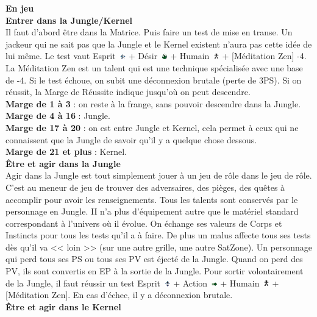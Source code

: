\documentclass[11pt,twoside,a4paper]{article}
\def\imgESPRI{\includegraphics[width=0.25cm]{../../../../../imgGraphics/rolePlayingGame/SimulacreS/mini12x12/esprit.png} }
\def\imgACTIO{\includegraphics[width=0.25cm]{../../../../../imgGraphics/rolePlayingGame/SimulacreS/mini12x12/action.png} }
\def\imgDESIR{\includegraphics[width=0.25cm]{../../../../../imgGraphics/rolePlayingGame/SimulacreS/mini12x12/desir.png} }
\def\imgHUMAI{\includegraphics[width=0.25cm]{../../../../../imgGraphics/rolePlayingGame/SimulacreS/mini12x12/humain.png} }
\begin{document}
\begin{multicols}{3}
{\textbf{\Large En jeu}~\\

\textbf{\large Entrer dans la Jungle/Kernel}~\\

Il faut d'abord {\^e}tre dans la Matrice. Puis faire un test de mise en transe. Un jackeur qui ne sait pas que la Jungle et le Kernel existent n'aura pas cette id{\'e}e de lui m{\^e}me. Le test vaut Esprit~\imgESPRI + D{\'e}sir~\imgDESIR + Humain~\imgHUMAI + [M{\'e}ditation Zen] -4. La M{\'e}ditation Zen est un talent qui est une technique sp{\'e}cialis{\'e}e avec une base de -4. Si le test {\'e}choue, on subit une d{\'e}connexion brutale (perte de 3PS). Si on r{\'e}ussit, la Marge de R{\'e}ussite indique jusqu'o{\`u} on peut descendre.~\\
\textbf{Marge de 1 {\`a} 3} : on reste {\`a} la frange, sans pouvoir descendre dans la Jungle.~\\
\textbf{Marge de 4 {\`a} 16} : Jungle. ~\\
\textbf{Marge de 17 {\`a} 20} : on est entre Jungle et Kernel, cela permet {\`a} ceux qui ne connaissent que la Jungle de savoir qu'il y a quelque chose dessous.~\\
\textbf{Marge de 21 et plus} : Kernel.~\\

\textbf{\large {\^E}tre et agir dans la Jungle}~\\

Agir dans la Jungle est tout simplement jouer {\`a} un jeu de r{\^o}le dans le jeu de r{\^o}le. C'est au meneur de jeu de trouver des adversaires, des pi{\`e}ges, des qu{\^e}tes {\`a} accomplir pour avoir les renseignements. Tous les talents sont conserv{\'e}s par le personnage en Jungle. II n'a plus d'{\'e}quipement autre que le mat{\'e}riel standard correspondant {\`a} l'univers o{\`u} il {\'e}volue. On {\'e}change ses valeurs de Corps et Instincts pour tous les tests qu'il a {\`a} faire. De plus un malus affecte tous ses tests d{\`e}s qu'il va << loin >> (sur une autre grille, une autre SatZone). Un personnage qui perd tous ses PS ou tous ses PV est {\'e}ject{\'e} de la Jungle. Quand on perd des PV, ils sont convertis en EP {\`a} la sortie de la Jungle. Pour sortir volontairement de la Jungle, il faut r{\'e}ussir un test Esprit~\imgESPRI + Action~\imgACTIO + Humain~\imgHUMAI + [M{\'e}ditation Zen]. En cas d'{\'e}chec, il y a d{\'e}connexion brutale.~\\

\textbf{\large {\^E}tre et agir dans le Kernel}~\\

}
\end{multicols}
\end{document}
